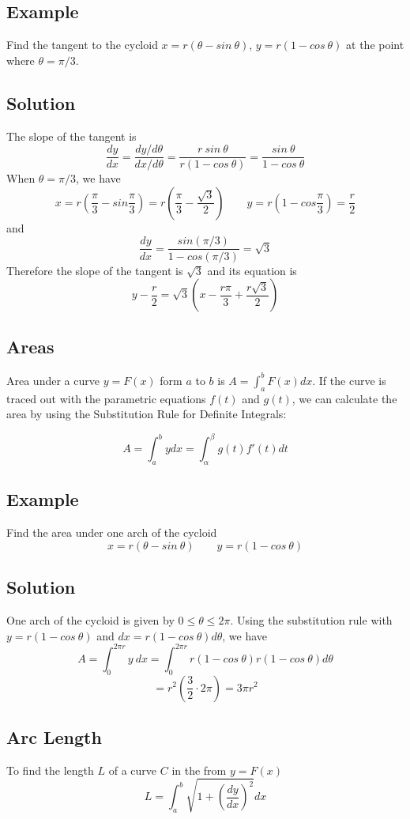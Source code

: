 \subsection*{Example}
Find the tangent to the cycloid $x=r(\theta - sin\: \theta)$, $y=r(1-cos\: \theta)$
at the point where $\theta=\pi/3$.

\subsection*{Solution}
The slope of the tangent is
$$\frac{dy}{dx}=\frac{dy/d\theta}{dx/d\theta}=\frac{r\: sin\: \theta}{r(1-cos\: \theta)}
    =\frac{sin\: \theta}{1-cos\: \theta}$$
When $\theta=\pi /3$, we have
$$x=r\left(\frac{\pi}{3}-sin\frac{\pi}{3}\right)=r\left(\frac{\pi}{3}-\frac{\sqrt{3}}{2}\right)
    \qquad y=r\left(1-cos\frac{\pi}{3}\right)=\frac{r}{2}$$
and
$$\frac{dy}{dx}=\frac{sin(\pi/3)}{1-cos(\pi/3)}=\sqrt{3}$$
Therefore the slope of the tangent is $\sqrt{3}$ and its equation is
$$y-\frac{r}{2}=\sqrt{3}\left(x-\frac{r\pi}{3}+\frac{r\sqrt{3}}{2}\right)$$

\subsection*{Areas}
Area under a curve $y = F(x)$ form $a$ to $b$ is $A = \int_a^b F(x) dx$.
If the curve is traced out with the parametric equations $f(t)$ and $g(t)$,
we can calculate the area by using the Substitution Rule for Definite Integrals:

$$A=\int_a^b ydx = \int_\alpha^\beta g(t)f'(t)dt$$

\subsection*{Example}
Find the area under one arch of the cycloid
$$x=r(\theta-sin\: \theta) \qquad y=r(1-cos\: \theta)$$

\subsection*{Solution}
One arch of the cycloid is given by $0\leq \theta \leq 2\pi$. Using the substitution
rule with $y=r(1-cos\: \theta)$ and $dx=r(1-cos\: \theta)d\theta$, we have
$$A=\int_0^{2\pi r}y\: dx=\int_0^{2\pi r}r(1-cos\: \theta)r(1-cos\: \theta)d\theta$$
$$=r^2(\frac{3}{2}\cdot 2\pi)=3\pi r^2$$

\subsection*{Arc Length}
To find the length $L$ of a curve $C$ in the from $y=F(x)$
$$ L = \int_a^b \sqrt{1+(\frac{dy}{dx})^2} dx $$

